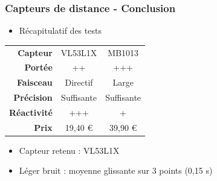 \documentclass{beamer}
\begin{document}
\begin{frame}
\frametitle{Capteurs de distance - Conclusion}
\begin{itemize}
\item Récapitulatif des tests
\end{itemize}
\begin{center}
\begin{tabular}{r|cc}
{\bf Capteur} & VL53L1X & MB1013 \\
{\bf Portée} & ++ & +++ \\ 
{\bf Faisceau} & Directif & Large \\
{\bf Précision} & Suffisante & Suffisante \\
{\bf Réactivité} & +++ & + \\
{\bf Prix} & 19,40 € & 39,90 € \\
\end{tabular}
\end{center}
\begin{itemize}
\item Capteur retenu : VL53L1X
\item Léger bruit : moyenne glissante sur 3 points (0,15 s)
\end{itemize}
\end{frame}
\end{document}
